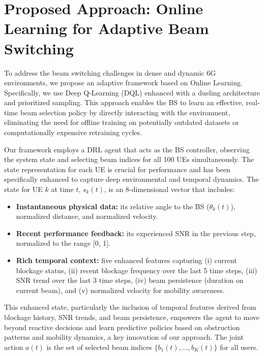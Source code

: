 \section{Proposed Approach: Online Learning for Adaptive Beam Switching}

\label{sec:Proposed_Approach}

To address the beam switching challenges in dense and dynamic 6G environments, we propose an adaptive framework based on Online Learning. Specifically, we use Deep Q-Learning (DQL) enhanced with a dueling architecture and prioritized sampling. This approach enables the BS to learn an effective, real-time beam selection policy by directly interacting with the environment, eliminating the need for offline training on potentially outdated datasets or computationally expensive retraining cycles.

Our framework employs a DRL agent that acts as the BS controller, observing the system state and selecting beam indices for all 100 UEs simultaneously. The state representation for each UE is crucial for performance and has been specifically enhanced to capture deep environmental and temporal dynamics. The state for UE $k$ at time $t$, $s_k(t)$, is an 8-dimensional vector that includes:

\begin{itemize}
    \item \textbf{Instantaneous physical data:} its relative angle to the BS ($\theta_k(t)$), normalized distance, and normalized velocity.
    \item \textbf{Recent performance feedback:} its experienced SNR in the previous step, normalized to the range [0, 1].
    \item \textbf{Rich temporal context:} five enhanced features capturing (i) current blockage status, (ii) recent blockage frequency over the last 5 time steps, (iii) SNR trend over the last 3 time steps, (iv) beam persistence (duration on current beam), and (v) normalized velocity for mobility awareness.
\end{itemize}

This enhanced state, particularly the inclusion of temporal features derived from blockage history, SNR trends, and beam persistence, empowers the agent to move beyond reactive decisions and learn predictive policies based on obstruction patterns and mobility dynamics, a key innovation of our approach. The joint action $a(t)$ is the set of selected beam indices $\{b_1(t), \ldots, b_K(t)\}$ for all users.

